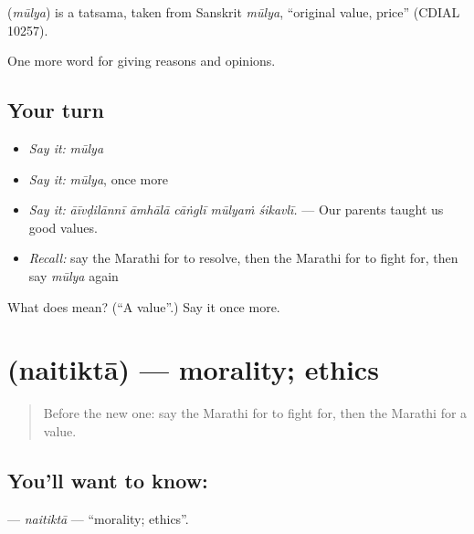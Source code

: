 \begin{cousinweb}
\textbf{} (\emph{mūlya}) is a tatsama, taken from Sanskrit \emph{mūlya}, \textquotedblleft{}original value, price\textquotedblright{} (CDIAL 10257).
\end{cousinweb}

\begin{grammarlens}[title={What you've built}]
One more word for giving reasons and opinions.
\end{grammarlens}

\subsection*{Your turn}
\begin{itemize}
\raggedright
  \item \emph{Say it:} \emph{mūlya}
  \item \emph{Say it:} \emph{mūlya}, once more
  \item \emph{Say it:} \emph{āīvḍilānnī āmhālā cāṅglī mūlyaṁ śikavlī.} — Our parents taught us good values.
  \item \emph{Recall:} say the Marathi for to resolve, then the Marathi for to fight for, then say \emph{mūlya} again
\end{itemize}

\begin{tcolorbox}[breakable,colback=teal!4,colframe=teal!35!black,title={Before you move on}]
What does  mean? (\textquotedblleft{}A value\textquotedblright{}.) Say it once more.
\end{tcolorbox}
\section[\texorpdfstring{\mr{नैतिकता} (naitiktā)}{नैतिकता (naitiktā)}]{ (naitiktā) — morality; ethics}

\label{lesson:MR-C366-naitikta}



\begin{quote}
Before the new one: say the Marathi for to fight for, then the Marathi for a value.
\end{quote}

\subsection*{You'll want to know: }
\textbf{} — \emph{naitiktā} — \textquotedblleft{}morality; ethics\textquotedblright{}.

